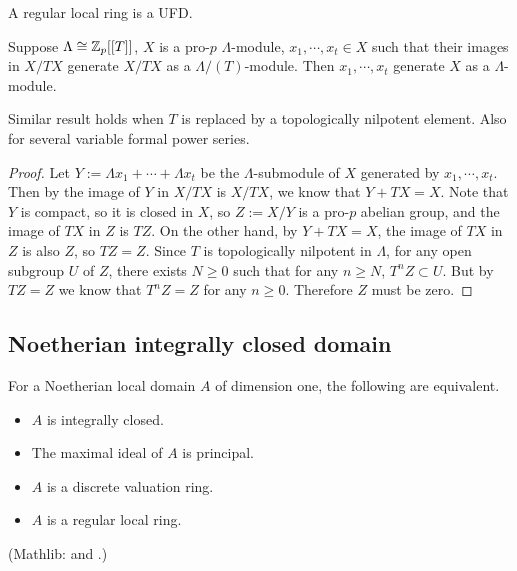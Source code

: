 \begin{thm}
\label{regular-local-ring-is-UFD}
A regular local ring is a UFD.
\end{thm}

\begin{lem}\label{p:nak}
Suppose $\Lambda\cong{\mathbb {Z}}_p[[T]]$,
$X$ is a pro-$p$ $\Lambda$-module,
$x_1,\cdots,x_t\in X$ such that their images in $X/TX$
generate $X/TX$ as a $\Lambda/(T)$-module.
Then $x_1,\cdots,x_t$ generate $X$ as a $\Lambda$-module.
\end{lem}

Similar result holds when $T$ is replaced
by a topologically nilpotent element.
Also for several variable formal power series.

\begin{proof}
Let $Y:=\Lambda x_1+\cdots+\Lambda x_t$ be the $\Lambda$-submodule
of $X$ generated by $x_1,\cdots,x_t$.
Then by the image of $Y$ in $X/TX$ is $X/TX$,
we know that $Y+TX=X$. Note that $Y$ is compact,
so it is closed in $X$, so $Z:=X/Y$ is a pro-$p$ abelian group,
and the image of $TX$ in $Z$ is $TZ$.
On the other hand, by $Y+TX=X$, the image of $TX$ in $Z$
is also $Z$, so $TZ=Z$. Since $T$ is topologically nilpotent in $\Lambda$,
for any open subgroup $U$ of $Z$, there exists $N\geq 0$ such that
for any $n\geq N$, $T^nZ\subset U$. But by $TZ=Z$ we know that
$T^nZ=Z$ for any $n\geq 0$. Therefore $Z$ must be zero.
\end{proof}

\subsection{Noetherian integrally closed domain}

\begin{prop}
\label{noeth-local-domain-is-icd-iff}
\leanok
For a Noetherian local domain $A$ of dimension one, the following are equivalent.
\begin{itemize}
\item
$A$ is integrally closed.
\item
The maximal ideal of $A$ is principal.
\item
$A$ is a discrete valuation ring.
\item
$A$ is a regular local ring.
\end{itemize}
(Mathlib:  and
.)
\end{prop}

